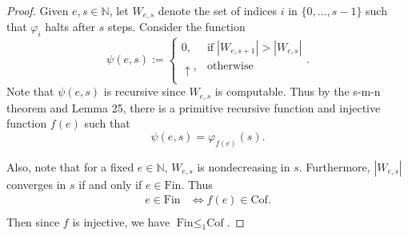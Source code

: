 \documentclass{article}
\begin{document}
\begin{enumerate}[label={\bf Q\arabic*:}]
    \begin{proof}
      Given $e,s\in\mathbb{N}$, let $W_{e,s}$ denote the set of indices $i$
      in $\{0,\ldots,s-1\}$ such that $\varphi_i$ halts after $s$ steps.
      Consider the function
      \begin{equation*}
        \psi(e,s) :=
        \begin{cases}
          0, &\text{if}\; |W_{e,s+1}|>|W_{e,s}|\\
          \uparrow, &\text{otherwise}\\
        \end{cases}.
      \end{equation*}
      Note that $\psi(e,s)$ is recursive since $W_{e,s}$ is computable.
      Thus by the s-m-n theorem and Lemma 25, there is a primitive
      recursive function and injective function $f(e)$ such that
      \[\psi(e,s)=\varphi_{f(e)}(s).\]

      Also, note that for a fixed $e\in\mathbb{N}$, $W_{e,s}$ is
      nondecreasing in $s$. Furthermore, $|W_{e,s}|$ converges in $s$ if
      and only if $e\in\text{Fin}$. Thus
      \begin{align*}
        e\in\text{Fin} &\Leftrightarrow f(e)\in\text{Cof}.\\
      \end{align*}
      Then since $f$ is injective, we have $\text{Fin}\leq_1\text{Cof}$.
    \end{proof}
\end{enumerate}
\end{document}

